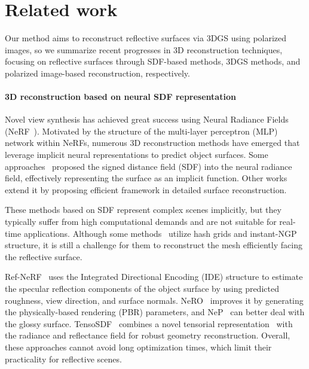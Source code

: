 
\section{Related work}
\label{sec:related}



Our method aims to reconstruct reflective surfaces via 3DGS using polarized images, so we summarize recent progresses in 3D reconstruction techniques, focusing on reflective surfaces through SDF-based methods, 3DGS methods, and polarized image-based reconstruction, respectively.


\paragraph{\textbf{3D reconstruction based on neural SDF representation}\quad}
Novel view synthesis has achieved great success using Neural Radiance Fields (NeRF~\citep{mildenhall2020nerf}). Motivated by the structure of the multi-layer perceptron (MLP) network within NeRFs, numerous 3D reconstruction methods have emerged that leverage implicit neural representations to predict object surfaces. Some approaches~\citep{niemeyer2020differentiable, yariv2020multiview} proposed the signed distance field (SDF) into the neural radiance field, effectively representing the surface as an implicit function. 
Other works~\citep{wang2021neus, yariv2021volume, oechsle2021unisurf, wang2022hf, wang2023neus2,li2023neuralangelo} extend it by proposing efficient framework in detailed surface reconstruction.

These methods based on SDF represent complex scenes implicitly, but they typically suffer from high computational demands and are not suitable for real-time applications. Although some methods~\citep{wang2023neus2, li2023neuralangelo} utilize hash grids and instant-NGP~\citep{mueller2022instant} structure, it is still a challenge for them to reconstruct the mesh efficiently facing the reflective surface. 

Ref-NeRF~\citep{verbin2022ref} uses the Integrated Directional Encoding (IDE) structure to estimate the specular reflection components of the object surface by using predicted roughness, view direction, and surface normals.
NeRO~\citep{liu2023nero} improves it by generating the physically-based rendering (PBR) parameters, and NeP~\citep{wang2024inverse} can better deal with the glossy surface.
TensoSDF~\citep{li2024tensosdf} combines a novel tensorial representation~\citep{chen2022tensorf} with the radiance and reflectance field for robust geometry reconstruction.
Overall, these approaches cannot avoid long optimization times, which limit their practicality for reflective scenes.

